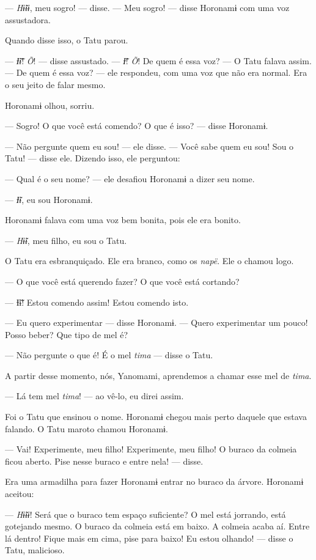 --- \textit{Hɨ̃ɨɨ}, meu sogro! --- disse. --- Meu sogro! --- disse Horonamɨ com
uma voz assustadora. 

Quando disse isso, o Tatu parou. 

--- \textit{Ɨ̃ɨ̃}! \textit{Õ}! --- disse assustado. --- \textit{Ɨ̃}! \textit{Õ}! De quem é 
essa voz? --- O Tatu falava assim. --- De quem é essa voz? --- ele respondeu, com uma voz que
não era normal. Era o seu jeito de falar mesmo. 

Horonamɨ olhou, sorriu.

--- Sogro! O que você está comendo? O que é isso? --- disse Horonamɨ. 

--- Não pergunte quem eu sou! --- ele disse. --- Você sabe quem eu sou!
Sou o Tatu! --- disse ele. Dizendo isso, ele perguntou: 

--- Qual é o seu nome? --- ele desafiou Horonamɨ a dizer seu nome. 

--- \textit{Ɨ̃ɨ}, eu sou Horonamɨ. 

Horonamɨ falava com uma voz bem bonita, pois ele era bonito. 

--- \textit{Hɨ̃ɨ}, meu filho, eu sou o Tatu. 

O Tatu era esbranquiçado. Ele era branco, como os \textit{napë}. Ele o
chamou logo. 

--- O que você está querendo fazer? O que você está cortando? 

--- Ɨ̃ɨ̃! Estou comendo assim! Estou comendo isto.

--- Eu quero experimentar --- disse Horonamɨ. --- Quero experimentar um
pouco! Posso beber? Que tipo de mel é? 

--- Não pergunte o que é! É o mel \textit{tima} --- disse o Tatu. 

A partir desse momento, nós, Yanomami, aprendemos a chamar esse mel
de \textit{tima}. 

--- Lá tem mel \textit{tima}! --- ao vê-lo, eu direi assim. 

Foi o Tatu que ensinou o nome. Horonamɨ chegou mais perto daquele que
estava falando. O Tatu maroto chamou Horonamɨ. 

--- Vai! Experimente, meu filho! Experimente, meu filho! O buraco da
colmeia ficou aberto. Pise nesse buraco e entre nela! --- disse. 

Era uma armadilha para fazer Horonamɨ entrar no buraco da árvore. Horonamɨ
aceitou: 

--- \textit{Hɨ̃ɨɨ}! Será que o buraco tem espaço suficiente? O mel está jorrando,
está gotejando mesmo. O buraco da colmeia está em baixo. A colmeia acaba
aí. Entre lá dentro! Fique mais em cima, pise para baixo! Eu estou
olhando! --- disse o Tatu, malicioso. 

